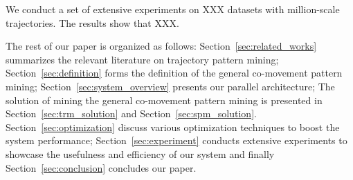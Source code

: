 
We conduct a set of extensive experiments on XXX datasets with million-scale trajectories. The results show that XXX.

The rest of our paper is organized as follows: Section~\ref{sec:related_works} summarizes the relevant literature on 
trajectory pattern mining; Section~\ref{sec:definition} forms the definition of the general co-movement pattern mining; Section~\ref{sec:system_overview} presents our parallel architecture; The solution of mining the general co-movement pattern mining is presented in Section~\ref{sec:trm_solution} and Section~\ref{sec:spm_solution}. Section~\ref{sec:optimization} discuss various optimization techniques to boost the system performance; Section~\ref{sec:experiment} conducts extensive experiments to showcase the usefulness and efficiency of our system and finally Section~\ref{sec:conclusion} concludes our paper.


